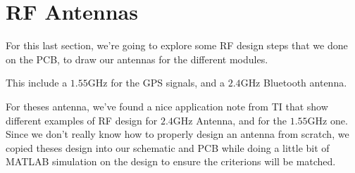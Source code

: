 \section{RF Antennas}
For this last section, we're going to explore some RF design steps that we done on the PCB,
to draw our antennas for the different modules.

This include a $1.55 \si{\giga\hertz}$ for the GPS signals, and a $2.4 \si{\giga\hertz}$
Bluetooth antenna.

For theses antenna, we've found a nice application note from TI \cite{InvertedF} that
show different examples of RF design for $2.4 \si{\giga\hertz}$  Antenna, and \cite{GNSS}
for the $1.55 \si{\giga\hertz}$ one. Since we don't really know how to properly design an
antenna from scratch, we copied theses design into our schematic and PCB while doing a
little bit of MATLAB simulation on the design to ensure the criterions will be matched.